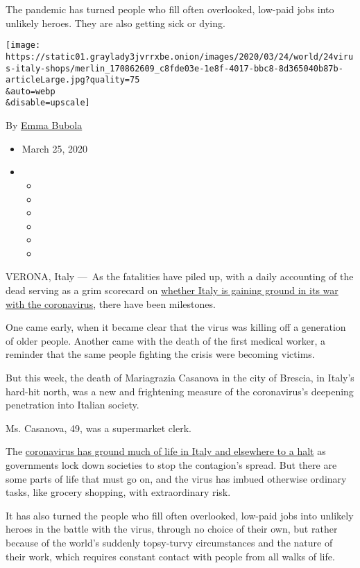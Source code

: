 The pandemic has turned people who fill often overlooked, low-paid jobs
into unlikely heroes. They are also getting sick or dying.

\texttt{[image: https://static01.graylady3jvrrxbe.onion/images/2020/03/24/world/24virus-italy-shops/merlin\_170862609\_c8fde03e-1e8f-4017-bbc8-8d365040b87b-articleLarge.jpg?quality=75\\\&auto=webp\\\&disable=upscale]}

By \href{https://www.nytimes3xbfgragh.onion/by/emma-bubola}{Emma Bubola}

\begin{itemize}
\item
  March 25, 2020
\item
  \begin{itemize}
  \item
  \item
  \item
  \item
  \item
  \item
  \end{itemize}
\end{itemize}

VERONA, Italy ---~As the fatalities have piled up, with a daily
accounting of the dead serving as a grim scorecard on
\href{https://www.nytimes3xbfgragh.onion/2020/03/16/world/europe/italy-coronavirus-funerals.html}{whether
Italy is gaining ground in its war with the coronavirus}, there have
been milestones.

One came early, when it became clear that the virus was killing off a
generation of older people. Another came with the death of the first
medical worker, a reminder that the same people fighting the crisis were
becoming victims.

But this week, the death of Mariagrazia Casanova in the city of Brescia,
in Italy's hard-hit north, was a new and frightening measure of the
coronavirus's deepening penetration into Italian society.

Ms. Casanova, 49, was a supermarket clerk.

The
\href{https://www.nytimes3xbfgragh.onion/2020/03/21/world/europe/italy-coronavirus-center-lessons.html}{coronavirus
has ground much of life in Italy and elsewhere to a halt} as governments
lock down societies to stop the contagion's spread. But there are some
parts of life that must go on, and the virus has imbued otherwise
ordinary tasks, like grocery shopping, with extraordinary risk.

It has also turned the people who fill often overlooked, low-paid jobs
into unlikely heroes in the battle with the virus, through no choice of
their own, but rather because of the world's suddenly topsy-turvy
circumstances and the nature of their work, which requires constant
contact with people from all walks of life.

